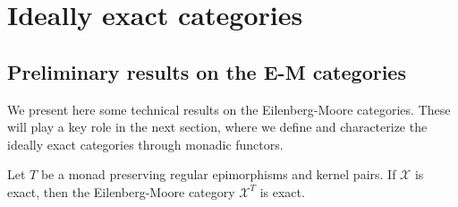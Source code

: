 \chapter{Ideally exact categories}

\fontsize{12}{14.5}\selectfont

\section{Preliminary results on the E-M categories}

We present here some technical results on the Eilenberg-Moore categories. These will play a key role in the next section, where we define and characterize the ideally exact categories through monadic functors.

\begin{mainbox}{}
    \begin{prop}\label{algebras category is exact if the base category is exact}
        Let $T$ be a monad preserving regular epimorphisms and kernel pairs. If $\mathcal{X}$ is exact, then the Eilenberg-Moore category $\mathcal{X}^T$ is exact.
    \end{prop}
\end{mainbox}


